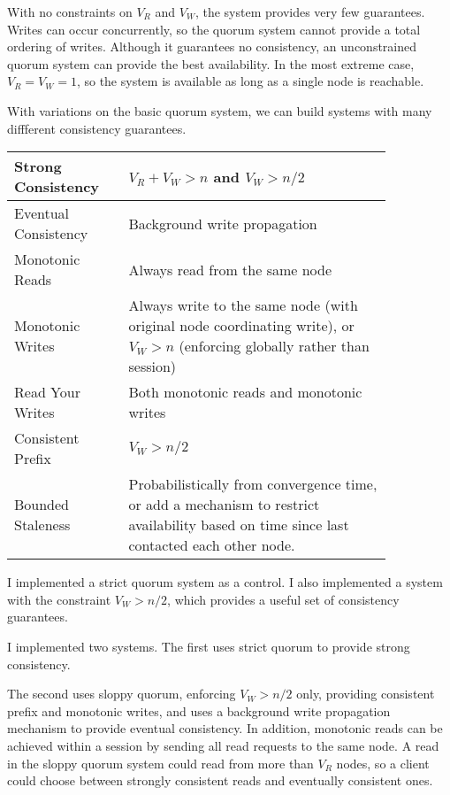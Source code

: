 \documentclass[12pt,a4paper,twoside,openright]{report}
\begin{document}
With no constraints on $V_R$ and $V_W$, the system provides very few guarantees. Writes can occur concurrently, so the quorum system cannot provide a total ordering of writes. Although it guarantees no consistency, an unconstrained quorum system can provide the best availability. In the most extreme case, $V_R = V_W = 1$, so the system is available as long as a single node is reachable.


With variations on the basic quorum system, we can build systems with many diffferent consistency guarantees.

\begin{table}[h!]
\centering
\begin{tabular}{| p{0.25\linewidth} | p{0.6\linewidth} |}
\hline
Strong Consistency & $V_R + V_W > n$ and $V_W > n/2$\\
\hline
Eventual Consistency & Background write propagation\\
\hline
Monotonic Reads & Always read from the same node\\
\hline
Monotonic Writes & Always write to the same node (with original node coordinating write), or $V_W > n$ (enforcing globally rather than session)\\
\hline
Read Your Writes & Both monotonic reads and monotonic writes\\
\hline
Consistent Prefix & $V_W > n/2$\\
\hline
Bounded Staleness & Probabilistically from convergence time, or add a mechanism to restrict availability based on time since last contacted each other node.\\
\hline
\end{tabular}
\end{table}

I implemented a strict quorum system as a control. I also implemented a system with the constraint $V_W > n/2$, which provides a useful set of consistency guarantees.

I implemented two systems. The first uses strict quorum to provide strong consistency.

The second uses sloppy quorum, enforcing $V_W > n/2$ only, providing consistent prefix and monotonic writes, and uses a background write propagation mechanism to provide eventual consistency. In addition, monotonic reads can be achieved within a session by sending all read requests to the same node. A read in the sloppy quorum system could read from more than $V_R$ nodes, so a client could choose between strongly consistent reads and eventually consistent ones.
\end{document}
